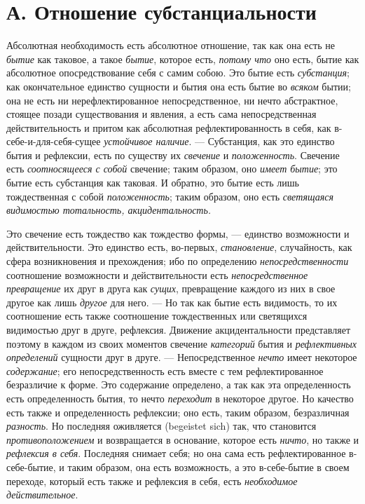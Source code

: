 \section[А. Отношение субстанциальности]{А. Отношение субстанциальности}

Абсолютная необходимость есть абсолютное
отношение, так как она есть не {\em бытие} как таковое,
а такое {\em бытие}, которое есть,
{\em потому что} оно есть, бытие как абсолютное
опосредствование себя с самим собою. Это бытие есть
{\em субстанция}; как окончательное единство сущности и
бытия она есть бытие во {\em всяком} бытии; она не есть
ни нерефлектированное непосредственное, ни нечто абстрактное, стоящее
позади существования и явления, а есть сама непосредственная
действительность и притом как абсолютная рефлектированность в себя, как
в-себе-и-для-себя-сущее {\em устойчивое наличие}. —
Субстанция, как это единство бытия и рефлексии, есть по существу их
{\em свечение} и
{\em положенность}. Свечение есть
{\em соотносящееся с собой} свечение; таким образом,
оно {\em имеет бытие}; это бытие есть субстанция как
таковая. И обратно, это бытие есть лишь тождественная с собой
{\em положенность}; таким образом, оно есть
{\em светящаяся видимостью тотальность,
акцидентальность.}

Это свечение есть тождество как тождество формы, — единство возможности и
действительности. Это единство есть, во-первых,
{\em становление}, случайность, как сфера возникновения
и прехождения; ибо по определению
{\em непосредственности} соотношение возможности и
действительности есть {\em непосредственное
превращение} их друг в друга как {\em сущих},
превращение каждого из них в свое другое как лишь
{\em другое} для него. — Но так как бытие есть
видимость, то их соотношение есть также соотношение тождественных или
светящихся видимостью друг в друге, рефлексия. Движение акцидентальности
представляет поэтому в каждом из своих моментов свечение
{\em категорий} бытия и
{\em рефлективных определений} сущности друг в друге. —
Непосредственное {\em нечто} имеет некоторое
{\em содержание}; его непосредственность есть вместе с
тем рефлектированное безразличие к форме. Это содержание определено, а так
как эта определенность есть определенность бытия, то нечто
{\em переходит} в некоторое другое. Но качество есть
также и определенность рефлексии; оно есть, таким образом, безразличная
{\em разность}. Но последняя оживляется (begeistet
sich) так, что становится {\em противоположением} и
возвращается в основание, которое есть {\em ничто}, но
также и {\em рефлексия в себя}. Последняя снимает себя;
но она сама есть рефлектированное в-себе-бытие, и таким образом, она есть
возможность, а это в-себе-бытие в своем переходе, который есть также и
рефлексия в себя, есть {\em необходимое
действительное}.

